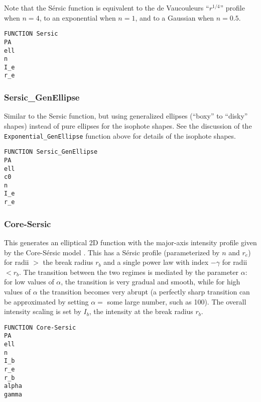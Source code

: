 \documentclass[10pt,a4paper,article]{memoir}
\begin{document}
Note that the S\'ersic function is equivalent to the de Vaucouleurs ``$r^{1/4}$'' profile
when $n = 4$, to an exponential when $n = 1$, and to a Gaussian when $n = 0.5$.

\begin{verbatim}
FUNCTION Sersic
PA
ell
n
I_e
r_e
\end{verbatim}


\subsubsection{Sersic\_GenEllipse}

Similar to the Sersic function, but using generalized ellipses (``boxy'' to
``disky'' shapes) instead of pure ellipses for the isophote shapes.  See the
discussion of the \texttt{Exponential\_GenEllipse} function above for details of the isophote
shapes.

\begin{verbatim}
FUNCTION Sersic_GenEllipse
PA
ell
c0
n
I_e
r_e
\end{verbatim}



\subsubsection{Core-Sersic}

This generates an elliptical 2D function with the major-axis intensity profile
given by the Core-S{\'e}rsic model \citep{graham03,trujillo04}. This has a
S\'ersic profile (parameterized by $n$ and $r_{e}$) for radii $>$ the break
radius $r_{b}$ and a single power law with index $-\gamma$ for radii $< r_{b}$.
The transition between the two regimes is mediated by the parameter $\alpha$:
for low values of $\alpha$, the transition is very gradual and smooth, while for
high values of $\alpha$ the transition becomes very abrupt (a perfectly sharp
transition can be approximated by setting $\alpha =$
some large number, such as 100). The overall intensity scaling is set by $I_{b}$,
the intensity at the break radius $r_{b}$.

\begin{verbatim}
FUNCTION Core-Sersic
PA
ell
n
I_b
r_e
r_b
alpha
gamma
\end{verbatim}



%
%
\end{document}
